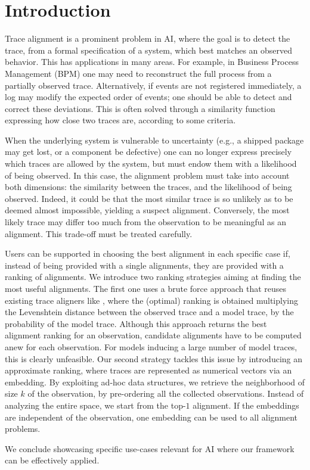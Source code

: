 
\section{Introduction}
\label{introduction}

Trace alignment is a prominent problem in AI, where the goal is to detect the trace, from a formal specification of a system,
which best matches an observed behavior. This has applications in many areas. For example, in Business Process Management (BPM)
one may need to reconstruct the full process from a partially observed trace. Alternatively, if events are not registered immediately,
a log may modify the expected order of events; one should be able to detect and correct these deviations. This is often solved
through a similarity function expressing how close two traces are, according to some criteria.

When the underlying system is vulnerable to uncertainty (e.g., a shipped package may get lost, or a component be defective)
one can no longer express precisely which traces are allowed by the system, but must endow them with a likelihood
of being observed. In this case, the alignment problem must take into account both dimensions: the similarity between the
traces, and the likelihood of being observed. Indeed, it could be that the most similar trace is so unlikely as to be deemed almost
impossible, yielding a suspect alignment. Conversely, the most likely trace may differ too much from the observation to be
meaningful as an alignment. This trade-off must be treated carefully. 

Users can be supported in choosing the best alignment in each specific case if, instead of being provided with a single alignments, they are provided with a ranking of alignments. We introduce two ranking strategies aiming at finding the most useful alignments. The first one uses a brute force approach that reuses existing trace aligners like \cite{DBLP:conf/edoc/AdriansyahDA11,LeoniM17}, where the (optimal) ranking
is obtained multiplying the Levenshtein distance between the observed trace and a model trace, by the probability of the
model trace. Although this approach returns the best alignment ranking for an observation, candidate alignments have to be computed
anew for each observation. For models inducing a large number of model traces, this is clearly unfeasible. Our second
strategy tackles this issue by introducing an approximate ranking, where traces are represented as numerical vectors via an embedding.
By exploiting ad-hoc data structures, we retrieve the neighborhood of size $k$ of the observation, by pre-ordering all the collected observations. Instead of analyzing the entire space, we start from the top-$1$ alignment. If the embeddings are
independent of the observation, one embedding can be used to all alignment problems.

We conclude showcasing specific use-cases relevant for AI where our framework can be effectively applied. 